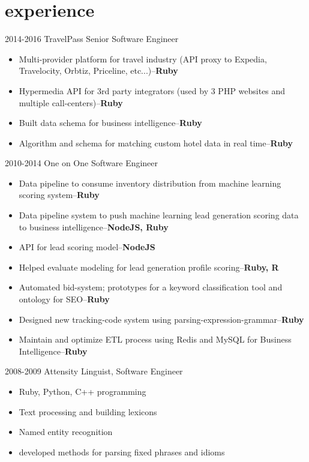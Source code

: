 \documentclass[]{friggeri-cv}
\begin{document}
\section{experience}
\begin{entrylist}
  \entry
    {2014-2016}
    {TravelPass}
    {Senior Software Engineer}
    {
    	\begin{itemize}
		\item Multi-provider platform for travel industry (API proxy to Expedia, Travelocity, Orbtiz, Priceline, etc...)--{\bf Ruby}
		\item Hypermedia API for 3rd party integrators (used by 3 PHP websites and multiple call-centers)--{\bf Ruby}
		\item Built data schema for business intelligence--{\bf Ruby}
		\item Algorithm and schema for matching custom hotel data in real time--{\bf Ruby}\\
	\end{itemize}
    }
  \entry
    {2010-2014}
    {One on One}
    {Software Engineer}
    {
    	\begin{itemize}
		\item Data pipeline to consume inventory distribution from machine learning scoring system--{\bf Ruby}
		\item Data pipeline system to push machine learning lead generation scoring data to business intelligence--{\bf NodeJS, Ruby}
		\item API for lead scoring model--{\bf NodeJS}
		\item Helped evaluate modeling for lead generation profile scoring--{\bf Ruby, R}\\
		\item Automated bid-system; prototypes for a keyword classification tool and ontology for SEO--{\bf Ruby}
		\item Designed new tracking-code system using parsing-expression-grammar--{\bf Ruby}
		\item Maintain and optimize ETL process using Redis and MySQL for Business Intelligence--{\bf Ruby}\\
	\end{itemize}
    }
  \entry
    {2008-2009}
    {Attensity}
    {Linguist, Software Engineer}
    {
    	\begin{itemize}
		\item Ruby, Python, C++ programming
		\item Text processing and building lexicons
		\item Named entity recognition
		\item developed methods for parsing fixed phrases and idioms\\
	\end{itemize}
    }
\end{entrylist}
\end{document}
